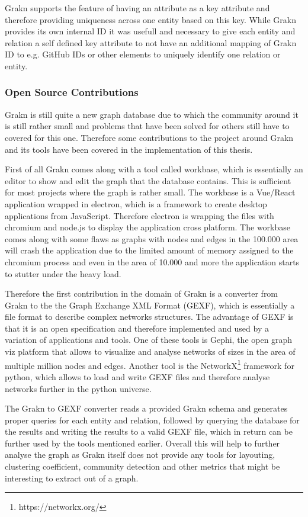 Grakn supports the feature of having an attribute as a key attribute and therefore providing uniqueness across one entity based on this key. While Grakn provides its own internal ID it was usefull and necessary to give each entity and relation a self defined key attribute to not have an additional mapping of Grakn ID to e.g. GitHub IDs or other elements to uniquely identify one relation or entity.

\subsubsection{Open Source Contributions}
Grakn is still quite a new graph database due to which the community around it is still rather small and problems that have been solved for others still have to covered for this one. Therefore some contributions to the project around Grakn and its tools have been covered in the implementation of this thesis.

First of all Grakn comes along with a tool called workbase, which is essentially an editor to show and edit the graph that the database contains. This is sufficient for most projects where the graph is rather small. The workbase is a Vue/React application wrapped in electron, which is a framework to create desktop applications from JavaScript. Therefore electron is wrapping the files with chromium and node.js to display the application cross platform. The workbase comes along with some flaws as graphs with nodes and edges in the 100.000 area will crash the application due to the limited amount of memory assigned to the chromium process and even in the area of 10.000 and more the application starts to stutter under the heavy load.

Therefore the first contribution in the domain of Grakn is a converter from Grakn to the the Graph Exchange XML Format (GEXF), which is essentially a file format to describe complex networks structures.
The advantage of GEXF is that it is an open specification and therefore implemented and used by a variation of applications and tools. One of these tools is Gephi, the open graph viz platform that allows to visualize and analyse networks of sizes in the area of multiple million nodes and edges. Another tool is the NetworkX\footnote{https://networkx.org/} framework for python, which allows to load and write GEXF files and therefore analyse networks further in the python universe.

The Grakn to GEXF converter reads a provided Grakn schema and generates proper queries for each entity and relation, followed by querying the database for the results and writing the results to a valid GEXF file, which in return can be further used by the tools mentioned earlier. Overall this will help to further analyse the graph as Grakn itself does not provide any tools for layouting, clustering coefficient, community detection and other metrics that might be interesting to extract out of a graph.

